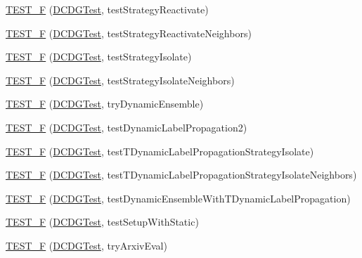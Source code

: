 \begin{DoxyCompactItemize}
\hyperlink{namespace_networ_kit_ab9db618aeee124754bae1b329c69475f}{T\-E\-S\-T\-\_\-\-F} (\hyperlink{class_networ_kit_1_1_d_c_d_g_test}{D\-C\-D\-G\-Test}, test\-Strategy\-Reactivate)
\item 
\hyperlink{namespace_networ_kit_ad53462600d24d7b1eb7e8d0ac1d85efc}{T\-E\-S\-T\-\_\-\-F} (\hyperlink{class_networ_kit_1_1_d_c_d_g_test}{D\-C\-D\-G\-Test}, test\-Strategy\-Reactivate\-Neighbors)
\item 
\hyperlink{namespace_networ_kit_a747641969b006d7a71739b379857a83c}{T\-E\-S\-T\-\_\-\-F} (\hyperlink{class_networ_kit_1_1_d_c_d_g_test}{D\-C\-D\-G\-Test}, test\-Strategy\-Isolate)
\item 
\hyperlink{namespace_networ_kit_a32edb8cc22bddf3a30271fbf7786ce1c}{T\-E\-S\-T\-\_\-\-F} (\hyperlink{class_networ_kit_1_1_d_c_d_g_test}{D\-C\-D\-G\-Test}, test\-Strategy\-Isolate\-Neighbors)
\item 
\hyperlink{namespace_networ_kit_a3d1a4c33947da770b9dea0509c803058}{T\-E\-S\-T\-\_\-\-F} (\hyperlink{class_networ_kit_1_1_d_c_d_g_test}{D\-C\-D\-G\-Test}, try\-Dynamic\-Ensemble)
\item 
\hyperlink{namespace_networ_kit_a7ae52770c2a9b161a125b19f4dd7cc6f}{T\-E\-S\-T\-\_\-\-F} (\hyperlink{class_networ_kit_1_1_d_c_d_g_test}{D\-C\-D\-G\-Test}, test\-Dynamic\-Label\-Propagation2)
\item 
\hyperlink{namespace_networ_kit_aeb73da2fd39351f8303b786d0084f274}{T\-E\-S\-T\-\_\-\-F} (\hyperlink{class_networ_kit_1_1_d_c_d_g_test}{D\-C\-D\-G\-Test}, test\-T\-Dynamic\-Label\-Propagation\-Strategy\-Isolate)
\item 
\hyperlink{namespace_networ_kit_a5e2c3eea5493f29fb8ed494161cd9a22}{T\-E\-S\-T\-\_\-\-F} (\hyperlink{class_networ_kit_1_1_d_c_d_g_test}{D\-C\-D\-G\-Test}, test\-T\-Dynamic\-Label\-Propagation\-Strategy\-Isolate\-Neighbors)
\item 
\hyperlink{namespace_networ_kit_a26ff67faa0b01a0f2a3255d4e66912aa}{T\-E\-S\-T\-\_\-\-F} (\hyperlink{class_networ_kit_1_1_d_c_d_g_test}{D\-C\-D\-G\-Test}, test\-Dynamic\-Ensemble\-With\-T\-Dynamic\-Label\-Propagation)
\item 
\hyperlink{namespace_networ_kit_a907468b87c2def41f18c514f4a31fba9}{T\-E\-S\-T\-\_\-\-F} (\hyperlink{class_networ_kit_1_1_d_c_d_g_test}{D\-C\-D\-G\-Test}, test\-Setup\-With\-Static)
\item 
\hyperlink{namespace_networ_kit_a2f1ba93d609d68d801286c3f6fafc44f}{T\-E\-S\-T\-\_\-\-F} (\hyperlink{class_networ_kit_1_1_d_c_d_g_test}{D\-C\-D\-G\-Test}, try\-Arxiv\-Eval)
\item 

\end{DoxyCompactItemize}
